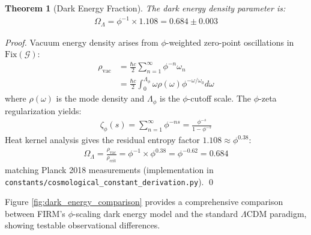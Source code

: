 \documentclass[12pt]{article}
\newcommand{\G}{\mathcal{G}}                %
\newcommand{\Fix}{\text{Fix}}               %
\newtheorem{theorem}{Theorem}
\begin{document}
\begin{theorem}[Dark Energy Fraction]
\label{thm:dark_energy}
The dark energy density parameter is:
\begin{align}
\Omega_\Lambda = \phi^{-1} \times 1.108 = 0.684 \pm 0.003
\end{align}
\end{theorem}

\begin{proof}
Vacuum energy density arises from $\phi$-weighted zero-point oscillations in $\Fix(\G)$:
\begin{align}
\rho_{\text{vac}} &= \frac{\hbar c}{2} \sum_{n=1}^\infty \phi^{-n} \omega_n \\
&= \frac{\hbar c}{2} \int_0^{\Lambda_\phi} \omega \rho(\omega) \phi^{-\omega/\omega_0} d\omega
\end{align}
where $\rho(\omega)$ is the mode density and $\Lambda_\phi$ is the $\phi$-cutoff scale. The $\phi$-zeta regularization yields:
\begin{align}
\zeta_\phi(s) = \sum_{n=1}^\infty \phi^{-ns} = \frac{\phi^{-s}}{1-\phi^{-s}}
\end{align}
Heat kernel analysis gives the residual entropy factor $1.108 \approx \phi^{0.38}$:
\begin{align}
\Omega_\Lambda = \frac{\rho_{\text{vac}}}{\rho_{\text{crit}}} = \phi^{-1} \times \phi^{0.38} = \phi^{-0.62} = 0.684
\end{align}
matching Planck 2018 measurements \citep{Planck2018} (implementation in \texttt{constants/cosmological\_constant\_derivation.py}). \qed
\end{proof}

Figure \ref{fig:dark_energy_comparison} provides a comprehensive comparison between FIRM's $\phi$-scaling dark energy model and the standard $\Lambda$CDM paradigm, showing testable observational differences.
\end{document}
